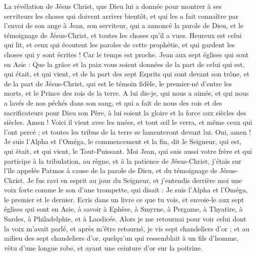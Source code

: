 \begin{multicols}{2}
\TextTitle{[Introduction]}
\VerseOne{}La révélation de Jésus Christ, que Dieu lui a donnée pour montrer à ses serviteurs les choses qui doivent arriver bientôt, et qui les a fait connaître par l’envoi de son ange à Jean, son serviteur,
qui a annoncé la parole de Dieu, et le témoignage de Jésus-Christ, et toutes les choses qu'il a vues.
Heureux est celui qui lit, et ceux qui écoutent les paroles de cette prophétie, et qui gardent les choses qui y sont écrites ! Car le temps est proche.
Jean aux sept églises qui sont en Asie : Que la grâce et la paix vous soient données de la part de celui qui est, qui était, et qui vient{}, et de la part des sept Esprits qui sont devant son trône,
et de la part de Jésus-Christ, qui est le témoin fidèle, le premier-né d'entre les morts{}, et le Prince des rois de la terre.
A lui dis-je, qui nous a aimés, et qui nous a lavés de nos péchés dans son sang, et qui a fait de nous des rois et des sacrificateurs pour Dieu son Père, à lui soient la gloire et la force aux siècles des siècles. Amen !
Voici il vient avec les nuées, et tout œil le verra, et même ceux qui l'ont percé ; et toutes les tribus de la terre se lamenteront devant lui. Oui, amen !
Je suis l'Alpha et l'Oméga, le commencement et la fin, dit le Seigneur, qui est, qui était, et qui vient, le Tout-Puissant.
Moi Jean, qui suis aussi votre frère et qui participe à la tribulation, au règne, et à la patience de Jésus-Christ, j'étais sur l'île appelée Patmos à cause de la parole de Dieu, et du témoignage de Jésus-Christ.
Je fus ravi en esprit au jour du Seigneur, et j'entendis derrière moi une voix forte comme le son d'une trompette,
qui disait : Je suis l'Alpha et l'Oméga, le premier et le dernier. Ecris dans un livre ce que tu vois, et envoie-le aux sept églises qui sont en Asie, à savoir à Ephèse, à Smyrne, à Pergame, à Thyatire, à Sardes, à Philadelphie, et à Laodicée.
Alors je me retournai pour voir celui dont la voix m'avait parlé, et après m’être retourné, je vis sept chandeliers d'or ;
et au milieu des sept chandeliers d'or, quelqu’un qui ressemblait à un fils d’homme, vêtu d'une longue robe, et ayant une ceinture d'or sur la poitrine.

\end{multicols}
